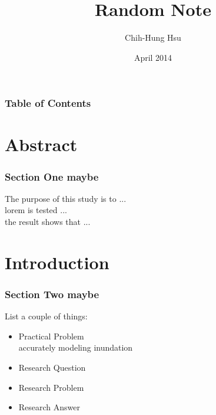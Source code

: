 \documentclass{beamer}
\title[About Beamer] %
{Random Note}
\subtitle{}
\author[] %
{Chih-Hung Hsu}
\date[GTI 2019] %
{April 2014}
\begin{document}
\frame{\titlepage}


\begin{frame}
\frametitle{Table of Contents}
\tableofcontents
\end{frame}

\section{Abstract}



\begin{frame}
\frametitle{Section One maybe}
The purpose of this study is to ...\\
lorem is tested ...\\
the result shows that ...\\
\end{frame}


\section{Introduction}
\begin{frame}
\frametitle{Section Two maybe}
List a couple of things:

\begin{itemize}
  \item Practical Problem\\
  accurately modeling inundation
  \item Research Question
  \item Research Problem
  \item Research Answer
\end{itemize}
\end{frame}
\end{document}
